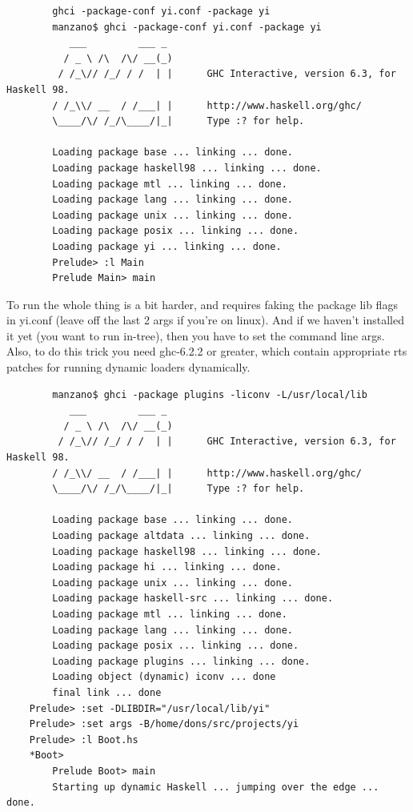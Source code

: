 \documentclass[]{article}
\begin{document}
{\small
\begin{verbatim}
        ghci -package-conf yi.conf -package yi
        manzano$ ghci -package-conf yi.conf -package yi
           ___         ___ _
          / _ \ /\  /\/ __(_)
         / /_\// /_/ / /  | |      GHC Interactive, version 6.3, for Haskell 98.
        / /_\\/ __  / /___| |      http://www.haskell.org/ghc/
        \____/\/ /_/\____/|_|      Type :? for help.

        Loading package base ... linking ... done.
        Loading package haskell98 ... linking ... done.
        Loading package mtl ... linking ... done.
        Loading package lang ... linking ... done.
        Loading package unix ... linking ... done.
        Loading package posix ... linking ... done.
        Loading package yi ... linking ... done.
        Prelude> :l Main
        Prelude Main> main
\end{verbatim}
}

To run the whole thing is a bit harder, and requires faking the package
lib flags in yi.conf (leave off the last 2 args if you're on linux). And
if we haven't installed it yet (you want to run in-tree), then you have
to set the command line args. Also, to do this trick you need ghc-6.2.2
or greater, which contain appropriate rts patches for running dynamic
loaders dynamically.

{\small
\begin{verbatim}
        manzano$ ghci -package plugins -liconv -L/usr/local/lib
           ___         ___ _
          / _ \ /\  /\/ __(_)
         / /_\// /_/ / /  | |      GHC Interactive, version 6.3, for Haskell 98.
        / /_\\/ __  / /___| |      http://www.haskell.org/ghc/
        \____/\/ /_/\____/|_|      Type :? for help.

        Loading package base ... linking ... done.
        Loading package altdata ... linking ... done.
        Loading package haskell98 ... linking ... done.
        Loading package hi ... linking ... done.
        Loading package unix ... linking ... done.
        Loading package haskell-src ... linking ... done.
        Loading package mtl ... linking ... done.
        Loading package lang ... linking ... done.
        Loading package posix ... linking ... done.
        Loading package plugins ... linking ... done.
        Loading object (dynamic) iconv ... done
        final link ... done
    Prelude> :set -DLIBDIR="/usr/local/lib/yi"
    Prelude> :set args -B/home/dons/src/projects/yi
    Prelude> :l Boot.hs
    *Boot>
        Prelude Boot> main
        Starting up dynamic Haskell ... jumping over the edge ... done.
\end{verbatim}
}
\end{document}
